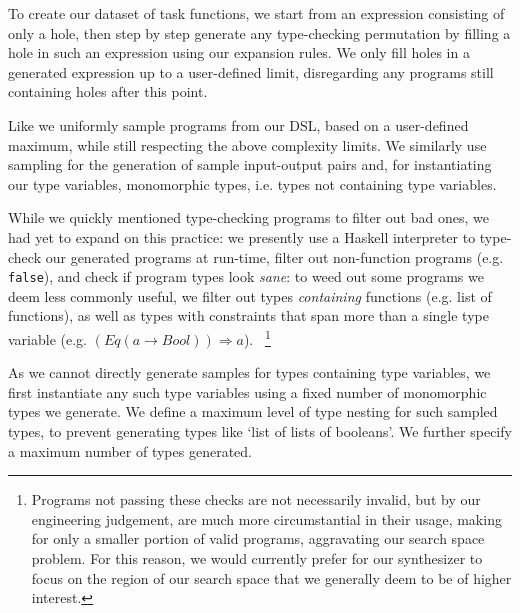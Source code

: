 \documentclass{article}
\begin{document}
To create our dataset of task functions,
we start from an expression consisting of only a hole,
then step by step generate any type-checking permutation
by filling a hole in such an expression using our expansion rules.
We only fill holes in a generated expression up to a 
user-defined limit,
disregarding any programs still containing holes after this point.

Like \citet{nsps} we uniformly sample programs from our DSL,
based on a 
user-defined maximum,
while still respecting the above complexity limits.
We similarly use sampling for the generation of sample input-output pairs and,
for instantiating our type variables, monomorphic types,
i.e. types not containing type variables.

While we quickly mentioned type-checking programs to filter out bad ones,
we had yet to expand on this practice:
we presently use a Haskell interpreter to type-check our generated programs at run-time,
filter out non-function programs (e.g. \verb|false|),
and check if program types look \emph{sane}:
to weed out some programs we deem less commonly useful,
we filter out types \emph{containing} functions (e.g. list of functions),
as well as types with constraints that span more than a single type variable (e.g. $(Eq (a \rightarrow Bool)) \Rightarrow a$).%
~\footnote{
    Programs not passing these checks are not necessarily invalid,
    but by our engineering judgement,
    are much more circumstantial in their usage,
    making for only a smaller portion of valid programs,
    aggravating our search space problem.
    For this reason, we would currently prefer for our synthesizer to focus on
    the region of our search space that we generally deem to be of higher interest.
}

As we cannot directly generate samples for types containing type variables,
we first instantiate any such type variables using a fixed number of monomorphic types we generate.
We define a
maximum level of type nesting for such sampled types,
to prevent generating types like `list of lists of booleans'.
We further specify a maximum number of types generated.
\end{document}
